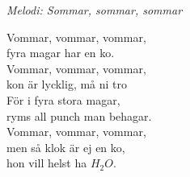{\footnotesize\textit{Melodi: Sommar, sommar, sommar}}\par
\vspace{10pt}
Vommar, vommar, vommar,\\
fyra magar har en ko.\\
Vommar, vommar, vommar,\\
kon är lycklig, må ni tro\\
För i fyra stora magar,\\
ryms all punch man behagar.\\
Vommar, vommar, vommar,\\
men så klok är ej en ko,\\
hon vill helst ha $H_2O$.
